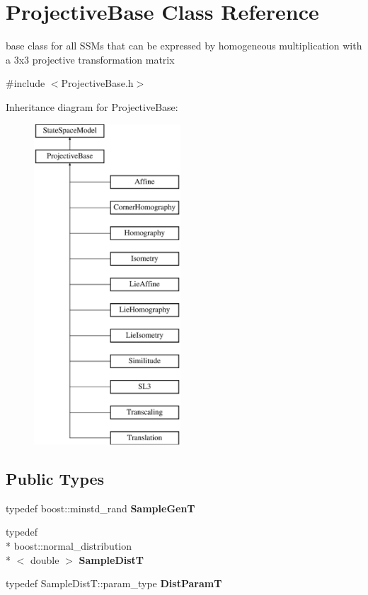 \hypertarget{classProjectiveBase}{\section{Projective\-Base Class Reference}
\label{classProjectiveBase}
}


base class for all S\-S\-Ms that can be expressed by homogeneous multiplication with a 3x3 projective transformation matrix  




{\ttfamily \#include $<$Projective\-Base.\-h$>$}

Inheritance diagram for Projective\-Base\-:\begin{figure}[H]
\begin{center}
\leavevmode
\includegraphics[height=12.000000cm]{classProjectiveBase}
\end{center}
\end{figure}
\subsection*{Public Types}
\begin{DoxyCompactItemize}
\item 
\hypertarget{classProjectiveBase_aa194546c058d67af644c3dc4fe072518}{typedef boost\-::minstd\-\_\-rand {\bfseries Sample\-Gen\-T}}\label{classProjectiveBase_aa194546c058d67af644c3dc4fe072518}

\item 
\hypertarget{classProjectiveBase_a7e146120c5c5f43543a669379808ac24}{typedef \\*
boost\-::normal\-\_\-distribution\\*
$<$ double $>$ {\bfseries Sample\-Dist\-T}}\label{classProjectiveBase_a7e146120c5c5f43543a669379808ac24}

\item 
\hypertarget{classProjectiveBase_abb4d5489045cf7862bb47c230077586f}{typedef Sample\-Dist\-T\-::param\-\_\-type {\bfseries Dist\-Param\-T}}\label{classProjectiveBase_abb4d5489045cf7862bb47c230077586f}

\end{DoxyCompactItemize}
